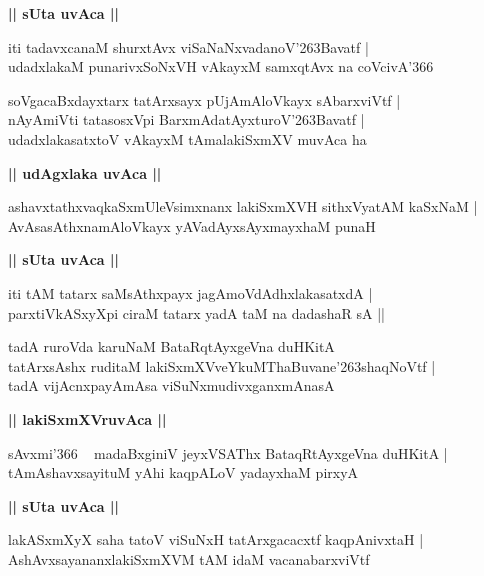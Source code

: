 \documentclass[twoside,12pt,openright]{book}
\def\S{\char'263}
\newcounter{shloka}[chapter]
\def\uvaca#1{\centerline{{\large\textbf{#1}}}}
\begin{document}
\uvaca{|| sUta uvAca ||}

\begin{shloka}%
iti tadavxcanaM shurxtAvx viSaNaNxvadanoV\S Bavatf |\\
udadxlakaM punarivxSoNxVH vAkayxM samxqtAvx na coVcivA\char'366 
\end{shloka}

\begin{shloka}%
soVgacaBxdayxtarx tatArxsayx pUjAmAloVkayx sAbarxviVtf |\\
nAyAmiVti tatasosxVpi BarxmAdatAyxturoV\S Bavatf |\\
udadxlakasatxtoV vAkayxM tAmalakiSxmXV muvAca ha 
\end{shloka}

\uvaca{|| udAgxlaka uvAca ||}

\begin{shloka}%
ashavxtathxvaqkaSxmUleVsimxnanx lakiSxmXVH sithxVyatAM kaSxNaM |\\
AvAsasAthxnamAloVkayx yAVadAyxsAyxmayxhaM punaH 
\end{shloka}

\uvaca{|| sUta uvAca ||}

\begin{shloka}%
iti tAM tatarx saMsAthxpayx jagAmoVdAdhxlakasatxdA |\\
parxtiVkASxyXpi ciraM tatarx yadA taM na dadashaR sA ||\\
\end{shloka}

\begin{shloka}%
tadA ruroVda karuNaM BataRqtAyxgeVna duHKitA \\
tatArxsAshx ruditaM lakiSxmXVveYkuMThaBuvane\S shaqNoVtf |\\
tadA vijAcnxpayAmAsa viSuNxmudivxganxmAnasA 
\end{shloka}

\uvaca{|| lakiSxmXVruvAca ||}

\begin{shloka}%
sAvxmi\char'366 ~ madaBxginiV jeyxVSAThx BataqRtAyxgeVna duHKitA |\\
tAmAshavxsayituM yAhi kaqpALoV yadayxhaM pirxyA 
\end{shloka}

\uvaca{|| sUta uvAca ||}

\begin{shloka}%
lakASxmXyX saha tatoV viSuNxH tatArxgacacxtf kaqpAnivxtaH |\\
AshAvxsayananxlakiSxmXVM tAM idaM vacanabarxviVtf 
\end{shloka}
\end{document}
